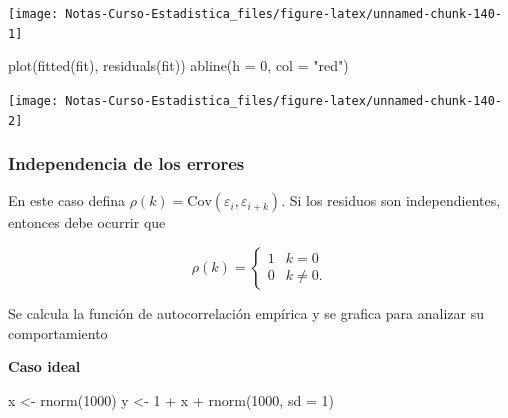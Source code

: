 \documentclass[
  12pt,
]{book}
\newenvironment{Shaded}{\begin{snugshade}}{\end{snugshade}}
\newcommand{\AttributeTok}[1]{\textcolor[rgb]{0.77,0.63,0.00}{#1}}
\newcommand{\DecValTok}[1]{\textcolor[rgb]{0.00,0.00,0.81}{#1}}
\newcommand{\FunctionTok}[1]{\textcolor[rgb]{0.00,0.00,0.00}{#1}}
\newcommand{\NormalTok}[1]{#1}
\newcommand{\OtherTok}[1]{\textcolor[rgb]{0.56,0.35,0.01}{#1}}
\newcommand{\SpecialCharTok}[1]{\textcolor[rgb]{0.00,0.00,0.00}{#1}}
\newcommand{\StringTok}[1]{\textcolor[rgb]{0.31,0.60,0.02}{#1}}
\begin{document}
\begin{example}
\begin{center}\texttt{[image: Notas-Curso-Estadistica\_files/figure-latex/unnamed-chunk-140-1]} \end{center}

\begin{Shaded}
\begin{Highlighting}[]
\FunctionTok{plot}\NormalTok{(}\FunctionTok{fitted}\NormalTok{(fit), }\FunctionTok{residuals}\NormalTok{(fit))}
\FunctionTok{abline}\NormalTok{(}\AttributeTok{h =} \DecValTok{0}\NormalTok{, }\AttributeTok{col =} \StringTok{"red"}\NormalTok{)}
\end{Highlighting}
\end{Shaded}

\begin{center}\texttt{[image: Notas-Curso-Estadistica\_files/figure-latex/unnamed-chunk-140-2]} \end{center}

\end{example}

\hypertarget{independencia-de-los-errores}{%
\subsubsection{Independencia de los
errores}\label{independencia-de-los-errores}}

En este caso defina
\(\rho(k) = \text{Cov}(\varepsilon_i,\varepsilon_{i+k} )\). Si los
residuos son independientes, entonces debe ocurrir que

\begin{equation*}
\rho(k) = \begin{cases}
1 & k=0\\
0 & k\neq 0.
\end{cases}  
\end{equation*}

Se calcula la función de autocorrelación empírica y se grafica para
analizar su comportamiento

\textbf{Caso ideal}

\begin{Shaded}
\begin{Highlighting}[]
\NormalTok{x }\OtherTok{\textless{}{-}} \FunctionTok{rnorm}\NormalTok{(}\DecValTok{1000}\NormalTok{)}
\NormalTok{y }\OtherTok{\textless{}{-}} \DecValTok{1} \SpecialCharTok{+}\NormalTok{ x }\SpecialCharTok{+} \FunctionTok{rnorm}\NormalTok{(}\DecValTok{1000}\NormalTok{, }\AttributeTok{sd =} \DecValTok{1}\NormalTok{)}
\end{Highlighting}
\end{Shaded}
\end{document}
